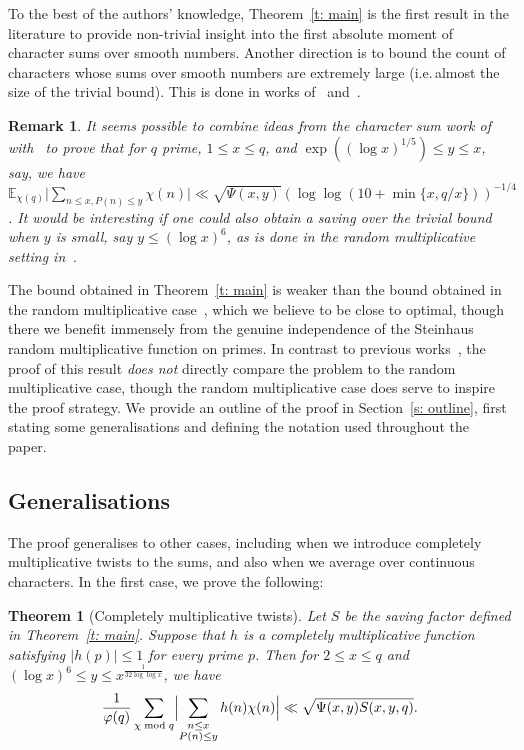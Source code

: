 \documentclass[a4paper,12pt,reqno]{amsart}
\newtheorem{theorem}{Theorem}
\newtheorem*{xremark}{Remark}
\newcommand{\E}{\mathbb{E}}
\begin{document}
To the best of the authors' knowledge, Theorem~\ref{t: main} is the first result in the literature to provide non-trivial insight into the first absolute moment of character sums over smooth numbers. Another direction is to bound the count of characters whose sums over smooth numbers are extremely large (i.e.\,almost the size of the trivial bound). This is done in works of~\citet{DrappeauGranvilleShao} and~\citet{Shparlinski}.

\begin{xremark}
\normalfont It seems possible to combine ideas from the character sum work of~\citet{HarperTypical} with~\cite[Theorem~1.3]{HardyXu} to prove that for $q$ prime, $1 \leq x \leq q$, and $\exp ((\log x)^{1/5}) \leq y \leq x$, say, we have $\E_{\chi (q)} \bigl| \sum_{n \leq x, P(n) \leq y} \chi(n) \bigr| \ll \sqrt{\Psi(x,y)} (\log \log (10 + \min \{ x, q/x\}))^{-1/4}$. It would be interesting if one could also obtain a saving over the trivial bound when $y$ is small, say $y \leq (\log x)^{6}$, as is done in the random multiplicative setting in~\cite[Theorem~1.4]{HardyXu}.
\end{xremark}

The bound obtained in Theorem~\ref{t: main} is weaker than the bound obtained in the random multiplicative case~\cite[Theorem~1.2]{HardyXu}, which we believe to be close to optimal, though there we benefit immensely from the genuine independence of the Steinhaus random multiplicative function on primes. In contrast to previous works~\cite{CaichShortInt, HarperTypical}, the proof of this result \emph{does not} directly compare the problem to the random multiplicative case, though the random multiplicative case does serve to inspire the proof strategy. We provide an outline of the proof in Section~\ref{s: outline}, first stating some generalisations and defining the notation used throughout the paper.

\subsection{Generalisations} The proof generalises to other cases, including when we introduce completely multiplicative twists to the sums, and also when we average over continuous characters. In the first case, we prove the following:

\begin{theorem}[Completely multiplicative twists]\label{t: mult twists}
Let $S$ be the saving factor defined in Theorem~\ref{t: main}. Suppose that $h$ is a completely multiplicative function satisfying $|h(p)| \leq 1$ for every prime $p$. Then for $2 \leq x \leq q$ and $(\log x)^6 \leq y \leq x^{\frac{1}{32 \log \log x}}$, we have
\[
\frac{1}{\varphi(q)} \sum_{\chi \bmod q} \Bigl| \sum_{\substack{n \leq x \\ P(n) \leq y}} h(n) \chi(n) \Bigr| \ll \sqrt{\Psi(x,y) S(x,y,q)}.
\]
\end{theorem}
\end{document}
